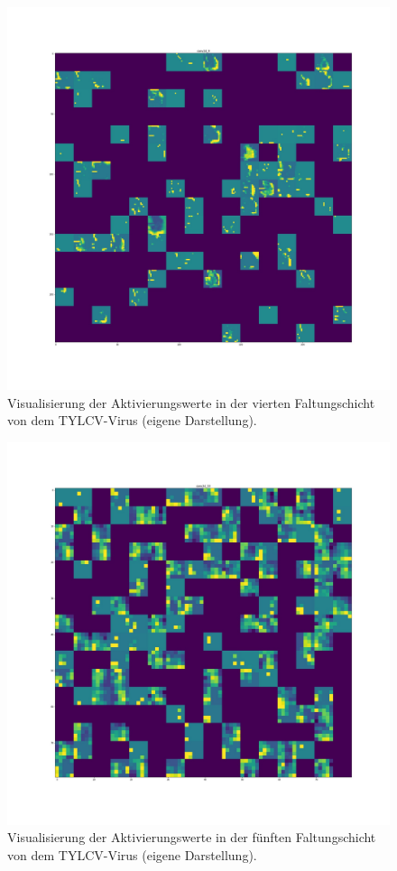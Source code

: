 \begin{figure}[h!]
	\centering
	\includegraphics[width=\textwidth]{visualisierungen/yellow/activation/yellow8.JPG}
	\caption{Visualisierung der Aktivierungswerte in der vierten Faltungschicht von dem TYLCV-Virus (eigene Darstellung).}
	\label{yellow8_anhang}
\end{figure}

\begin{figure}[h!]
	\centering
	\includegraphics[width=\textwidth]{visualisierungen/yellow/activation/yellow10.JPG}
	\caption{Visualisierung der Aktivierungswerte in der fünften Faltungschicht von dem TYLCV-Virus (eigene Darstellung).}
	\label{}
\end{figure}

